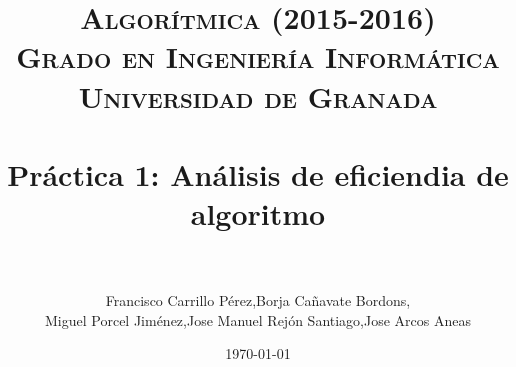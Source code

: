 

\title{	
\normalfont \normalsize 
\textsc{{\bf Algorítmica (2015-2016)} \\ Grado en Ingeniería Informática \\ Universidad de Granada} \\ [25pt] %
\horrule{0.5pt} \\[0.4cm] %
\huge Práctica 1: Análisis de eficiendia de algoritmo \\ %
\horrule{2pt} \\[0.5cm] %
}

\author{Francisco Carrillo Pérez,Borja Cañavate Bordons, \\Miguel Porcel Jiménez,Jose Manuel Rejón Santiago,Jose Arcos Aneas} %

\date{\normalsize\today} %




\maketitle %

\newpage %

\tableofcontents %

\listoffigures

\listoftables

\newpage

